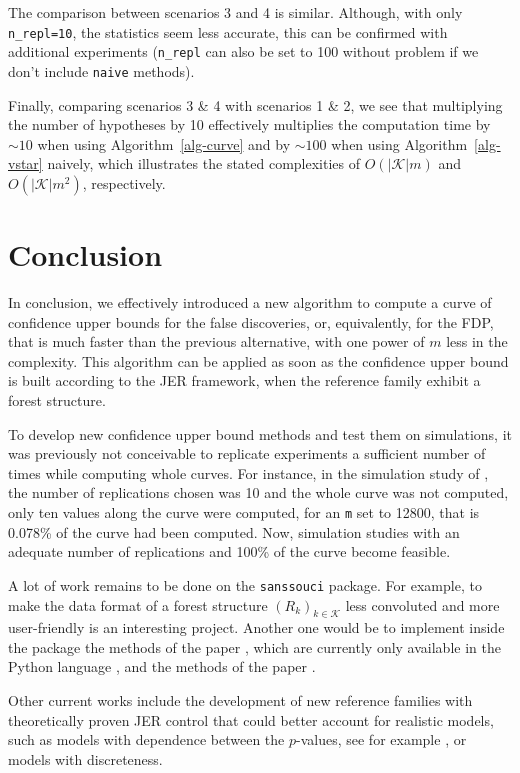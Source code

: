 \documentclass[
  11pt,
  a4paper,
]{article}
\theoremstyle{plain}
\theoremstyle{definition}
\theoremstyle{plain}
\theoremstyle{definition}
\theoremstyle{plain}
\theoremstyle{remark}
\begin{document}
The comparison between scenarios 3 and 4 is similar. Although, with only
\texttt{n\_repl=10}, the statistics seem less accurate, this can be
confirmed with additional experiments (\texttt{n\_repl} can also be set
to 100 without problem if we don't include \texttt{naive} methods).

Finally, comparing scenarios 3 \& 4 with scenarios 1 \& 2, we see that
multiplying the number of hypotheses by 10 effectively multiplies the
computation time by \(\sim10\) when using  Algorithm~\ref{alg-curve} 
and by \(\sim100\) when using  Algorithm~\ref{alg-vstar}  naively, which
illustrates the stated complexities of \(O(|\mathcal{K}|m)\) and
\(O(|\mathcal{K}|m^2)\), respectively.

\section{Conclusion}\label{sec-conclusion}

In conclusion, we effectively introduced a new algorithm to compute a
curve of confidence upper bounds for the false discoveries, or,
equivalently, for the FDP, that is much faster than the previous
alternative, with one power of \(m\) less in the complexity. This
algorithm can be applied as soon as the confidence upper bound is built
according to the JER framework, when the reference family exhibit a
forest structure.

To develop new confidence upper bound methods and test them on
simulations, it was previously not conceivable to replicate experiments
a sufficient number of times while computing whole curves. For instance,
in the simulation study of \citet{MR4178188}, the number of replications
chosen was 10 and the whole curve was not computed, only ten values
along the curve were computed, for an \texttt{m} set to 12800, that is
0.078\% of the curve had been computed. Now, simulation studies with an
adequate number of replications and 100\% of the curve become feasible.

A lot of work remains to be done on the \texttt{sanssouci} package. For
example, to make the data format of a forest structure
\((R_k)_{k\in\mathcal{K}}\) less convoluted and more user-friendly is an
interesting project. Another one would be to implement inside the
package the methods of the paper \citet{blain22notip}, which are
currently only available in the Python language \citep{10.5555/1593511},
and the methods of the paper \citet{JMLR:v25:23-1025}.

Other current works include the development of new reference families
with theoretically proven JER control that could better account for
realistic models, such as models with dependence between the
\(p\)-values, see for example \citet{perrot2023selective}, or models
with discreteness.
\end{document}
